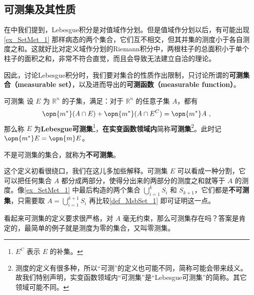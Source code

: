 

\subsection{可测集及其性质}

在中我们提到，Lebesgue积分是对值域作分划。但是值域作分划以后，有可能出现\autoref{ex_SetMet_1} 那样病态的两个集合，它们互不相交，但其并集的测度小于各自测度之和。这就好比对定义域作分划的Riemann积分中，两根柱子的总面积小于单个柱子的面积之和，非常不符合直觉，而且会导致无法建立自洽的理论。

因此，讨论Lebesgue积分时，我们要对集合的性质作出限制，只讨论所谓的\textbf{可测集合（measurable set）}，以及进而导出的\textbf{可测函数（measurable function）}。

\begin{definition}{可测集}\label{def_MsbSet_1}
设 $E$ 为 $\mathbb{R}^n$ 的子集，满足：对于 $\mathbb{R}^n$ 的任意子集 $A$，都有
\begin{equation}
\opn{m^*}(A\cap E)+\opn{m^*}(A\cap E^C)=\opn{m^*}A~,
\end{equation}
那么称 $E$ 为\textbf{Lebesgue可测集}\footnote{$E^C$ 表示 $E$ 的补集。}，\textbf{在实变函数领域内}简称\textbf{可测集}\footnote{测度的定义有很多种，所以“可测”的定义也可能不同，简称可能会带来歧义。故我们特别声明，实变函数领域内“可测集”是“Lebesgue可测集”的简称。其它领域可能不同。}。此时记 $\opn{m^*}E=\opn{m}E$。

不是可测集的集合，就称为\textbf{不可测集}。

\end{definition}

这个定义初看很绕口，我们在这儿多加些解释。可测集 $E$ 可以看成一种分割，它可以把任何集合 $A$ 都分成两部分，使得分出来的两部分的测度之和就等于 $A$ 的测度。像\autoref{ex_SetMet_1} 中最后构造的两个集合 $\bigcup_{i=1}^k S_i$ 和 $S_{k+1}$，它们都是\textbf{不可测集}，只需要取 $A=\bigcup^{k+1}_{i=1} S_i$ 再比较\autoref{def_MsbSet_1} 即可证明这一点。

看起来可测集的定义要求很严格，对 $A$ 毫无约束，那么可测集存在吗？答案是肯定的，最简单的例子就是测度为零的集合，又叫零测集。

